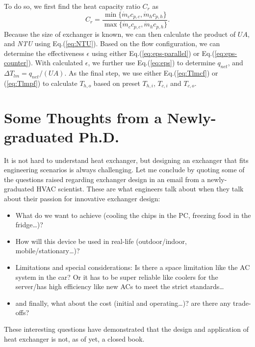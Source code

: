  To do so, we first find the heat capacity ratio $ C_r $ as
\begin{equation}
	C_r = \frac{\min\{\dot{m}_cc_{p,c}, \dot{m}_hc_{p,h}\}}{\max\{\dot{m}_cc_{p,c}, \dot{m}_hc_{p,h}\}}.
\end{equation}
Because the size of exchanger is known, we can then calculate the product of $ UA $, and \textit{NTU} using Eq.(\ref{eq:NTU}). Based on the flow configuration, we can determine the effectiveness $ \epsilon $ using either Eq.(\ref{eq:eps-parallel}) or Eq.(\ref{eq:eps-counter}). With calculated $ \epsilon $, we further use Eq.(\ref{eq:eps}) to determine $ q_{net} $, and $ \Delta T_{lm}= q_{net}/(UA) $. As the final step, we use either Eq.(\ref{eq:Tlmcf}) or (\ref{eq:Tlmpf}) to calculate $ T_{h,o} $ based on preset $ T_{h,i} $, $ T_{c,i} $ and $ T_{c,o} $.
\section{Some Thoughts from a Newly-graduated Ph.D.}
It is not hard to understand heat exchanger, but designing an exchanger that fits engineering scenarios is always challenging. Let me conclude by quoting some of the questions raised regarding exchanger design in an email from a newly-graduated HVAC scientist.  These are what engineers talk about when they talk about their passion for innovative exchanger design:
\begin{itemize}
	\item What do we want to achieve (cooling the chips in the PC, freezing food in the fridge…)?
	\item How will this device be used in real-life (outdoor/indoor, mobile/stationary…)? 
	\item Limitations and special considerations: Is there a space limitation like the AC system in the car? Or it has to be super reliable like coolers for the server/has high efficiency like new ACs to meet the strict standards…
	\item and finally, what about the cost (initial and operating…)? are there any trade-offs?
\end{itemize}
These interesting questions have demonstrated that the design and application of heat exchanger is not, as of yet, a closed book.
